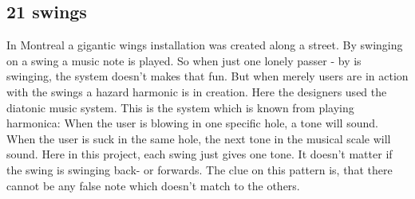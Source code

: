 \subsection{21 swings}


In Montreal a gigantic wings installation was created along a street.\newline
By swinging on a swing a music note is played. So when just one lonely passer - by is swinging, the system doesn't makes that fun. But when merely users are in action with the swings a hazard harmonic is in creation. \newline
Here the designers used the diatonic music system. This is the system which is known from playing harmonica: When the user is blowing in one specific hole, a tone will sound. When the user is suck in the same hole, the next tone in the musical scale will sound. Here in this project, each swing just gives one tone. It doesn't matter if the swing is swinging back- or forwards. The clue on this pattern is, that there cannot be any false note which doesn't match to the others.\newline
{}                
